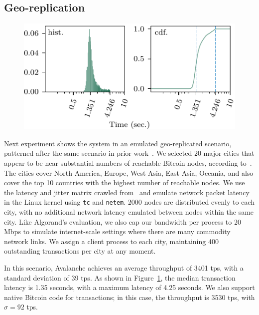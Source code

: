 \subsection{Geo-replication}%

\begin{figure}
\includegraphics[width=\linewidth]{figures/lat4.pdf}
\label{fig:eval-lat4}
\end{figure}

Next experiment shows the system in an emulated geo-replicated scenario, patterned
after the same scenario in prior work~\cite{GiladHMVZ17}.
We selected 20 major cities that appear to be near substantial numbers of reachable
Bitcoin nodes, according to~\cite{bitnodes2018}. The cities cover North America,
Europe, West Asia, East Asia, Oceania, and also cover the top 10 countries with the
highest number of reachable nodes. We use the latency and jitter matrix crawled
from~\cite{wondernetworkping2018} and emulate network packet latency in the Linux kernel using
\texttt{tc} and \texttt{netem}. 2000 nodes are distributed evenly to each
city, with no additional network latency emulated between nodes within the same city.
Like Algorand's evaluation, we also cap our bandwidth per process to 20 Mbps
to simulate internet-scale settings where there are many commodity network links.
We assign a client process to each city, maintaining 400 outstanding transactions per city
at any moment.

In this scenario, Avalanche achieves an average throughput of 3401 tps, with a standard deviation of 39 tps.
As shown in Figure~\ref{fig:eval-lat4}, the median transaction latency
is 1.35 seconds, with a maximum latency of 4.25 seconds. We also support native Bitcoin code
for transactions; in this case, the throughput is 3530 tps, with $\sigma = 92$ tps.


